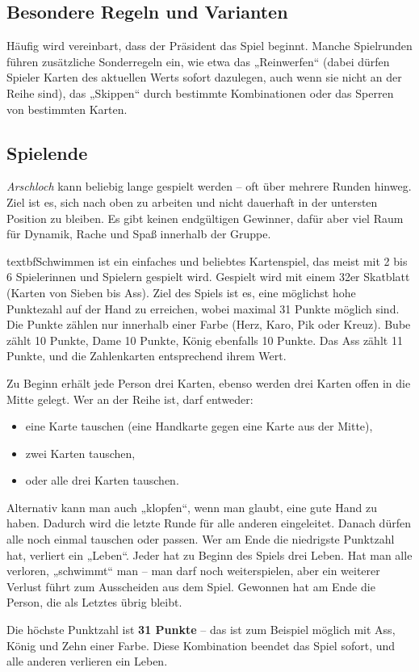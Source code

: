 \subsection*{Besondere Regeln und Varianten}

Häufig wird vereinbart, dass der Präsident das Spiel beginnt. Manche Spielrunden führen zusätzliche Sonderregeln ein, wie etwa das „Reinwerfen“ (dabei dürfen Spieler Karten des aktuellen Werts sofort dazulegen, auch wenn sie nicht an der Reihe sind), das „Skippen“ durch bestimmte Kombinationen oder das Sperren von bestimmten Karten.

\subsection*{Spielende}

\textit{Arschloch} kann beliebig lange gespielt werden – oft über mehrere Runden hinweg. Ziel ist es, sich nach oben zu arbeiten und nicht dauerhaft in der untersten Position zu bleiben. Es gibt keinen endgültigen Gewinner, dafür aber viel Raum für Dynamik, Rache und Spaß innerhalb der Gruppe.


textbf{Schwimmen} ist ein einfaches und beliebtes Kartenspiel, das meist mit 2 bis 6 Spielerinnen und Spielern gespielt wird. Gespielt wird mit einem 32er Skatblatt (Karten von Sieben bis Ass). Ziel des Spiels ist es, eine möglichst hohe Punktezahl auf der Hand zu erreichen, wobei maximal 31 Punkte möglich sind. Die Punkte zählen nur innerhalb einer Farbe (Herz, Karo, Pik oder Kreuz). Bube zählt 10 Punkte, Dame 10 Punkte, König ebenfalls 10 Punkte. Das Ass zählt 11 Punkte, und die Zahlenkarten entsprechend ihrem Wert.

Zu Beginn erhält jede Person drei Karten, ebenso werden drei Karten offen in die Mitte gelegt. Wer an der Reihe ist, darf entweder:

\begin{itemize}
	\item eine Karte tauschen (eine Handkarte gegen eine Karte aus der Mitte),
	\item zwei Karten tauschen,
	\item oder alle drei Karten tauschen.
\end{itemize}

Alternativ kann man auch „klopfen“, wenn man glaubt, eine gute Hand zu haben. Dadurch wird die letzte Runde für alle anderen eingeleitet. Danach dürfen alle noch einmal tauschen oder passen. Wer am Ende die niedrigste Punktzahl hat, verliert ein „Leben“. Jeder hat zu Beginn des Spiels drei Leben. Hat man alle verloren, „schwimmt“ man – man darf noch weiterspielen, aber ein weiterer Verlust führt zum Ausscheiden aus dem Spiel. Gewonnen hat am Ende die Person, die als Letztes übrig bleibt.

Die höchste Punktzahl ist \textbf{31 Punkte} – das ist zum Beispiel möglich mit Ass, König und Zehn einer Farbe. Diese Kombination beendet das Spiel sofort, und alle anderen verlieren ein Leben.